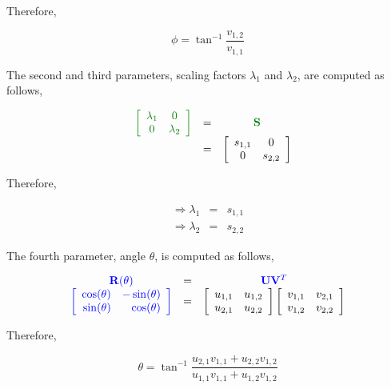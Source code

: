 Therefore,

\begin{equation}
\boxed{\phi = \tan^{-1}\frac{v_{1,2}}{v_{1,1}}}
\end{equation}

The second and third parameters, scaling factors $\lambda_1$ and $\lambda_2$, are computed as follows,

\begin{equation}
\begin{array}{ccccc}
&{\color{darkgreen}\EigenvalueMatrix} &=&{\color{darkgreen}\mathbf{S}}\\
&&=&\left[\begin{array}{cccc}s_{1,1} & 0\\0 &s_{2,2}\end{array}\right]\\
\end{array}
\end{equation}

Therefore,

\begin{equation}
\boxed{
\begin{array}{cccc}
\Rightarrow \lambda_1 &=&  s_{1,1}\\
\Rightarrow \lambda_2 &=& s_{2,2}
\end{array}}
\end{equation}

The fourth parameter, angle $\theta$, is computed as follows,  

\begin{equation}
\begin{array}{ccccc}
{\color{blue}\mathbf{R}(\theta)} &=&  {\color{blue}\mathbf{U}\mathbf{V}^T}\\
{\color{blue}\left[ \begin{array}{rr} \cos(\theta) & -\sin(\theta) \\ \sin(\theta) & \cos(\theta) \\ \end{array} \right]} &= &\left[\begin{array}{llll}u_{1,1} & u_{1,2}\\u_{2,1} & u_{2,2}\end{array}\right]\left[\begin{array}{llll}v_{1,1} & v_{2,1}\\v_{1,2} & v_{2,2}\end{array}\right] \\
\end{array}
\end{equation}


Therefore,

\begin{equation}
\boxed{\theta = \tan^{-1}\frac{u_{2,1}v_{1,1} + u_{2,2}v_{1,2}}{u_{1,1}v_{1,1} + u_{1,2}v_{1,2}}}
\end{equation}

